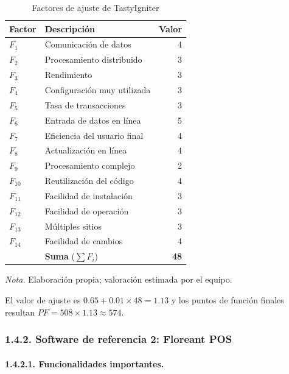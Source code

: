 \begin{table}[H]
\caption{Factores de ajuste de TastyIgniter}
\label{tab:ref1_fi}
\begin{threeparttable}
\begin{tabular}{>{\raggedright\arraybackslash}p{1.4cm} >{\raggedright\arraybackslash}p{7cm} r}
\toprule
Factor & Descripción & Valor \\
\midrule
$F_{1}$ & Comunicación de datos & 4 \\
$F_{2}$ & Procesamiento distribuido & 3 \\
$F_{3}$ & Rendimiento & 3 \\
$F_{4}$ & Configuración muy utilizada & 3 \\
$F_{5}$ & Tasa de transacciones & 3 \\
$F_{6}$ & Entrada de datos en línea & 5 \\
$F_{7}$ & Eficiencia del usuario final & 4 \\
$F_{8}$ & Actualización en línea & 4 \\
$F_{9}$ & Procesamiento complejo & 2 \\
$F_{10}$ & Reutilización del código & 4 \\
$F_{11}$ & Facilidad de instalación & 3 \\
$F_{12}$ & Facilidad de operación & 3 \\
$F_{13}$ & Múltiples sitios & 3 \\
$F_{14}$ & Facilidad de cambios & 4 \\
 & \textbf{Suma} ($\sum F_i$) & \textbf{48} \\
\bottomrule
\end{tabular}
\begin{tablenotes}
\item \textit{Nota.} Elaboración propia; valoración estimada por el equipo.
\end{tablenotes}
\end{threeparttable}
\end{table}

El valor de ajuste es $0.65 + 0.01 \times 48 = 1.13$ y los puntos de función finales resultan $PF = 508 \times 1.13 \approx 574$.

\subsubsection{1.4.2. Software de referencia 2: Floreant POS}

\paragraph{1.4.2.1. Funcionalidades importantes.}

